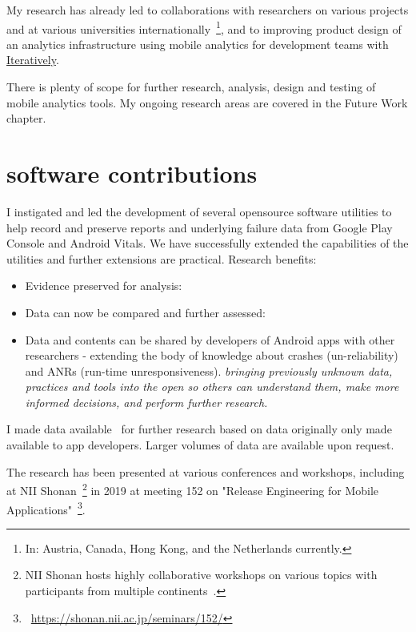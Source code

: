 My research has already led to collaborations with researchers on various projects and at various universities internationally~\footnote{In: Austria, Canada, Hong Kong, and the Netherlands currently.}, and to improving product design of an analytics infrastructure using mobile analytics for development teams with \href{https://iterative.ly/}{Iteratively}. 

There is plenty of scope for further research, analysis, design and testing of mobile analytics tools. My ongoing research areas are covered in the Future Work chapter.

\section{software contributions}
I instigated and led the development of several opensource software utilities to help record and preserve reports and underlying failure data from Google Play Console and Android Vitals. We have successfully extended the capabilities of the utilities and further extensions are practical. Research benefits:
\begin{itemize}
    \item Evidence preserved for analysis:
    \item Data can now be compared and further assessed:
    \item Data and contents can be shared by developers of Android apps with other researchers - extending the body of knowledge about crashes (un-reliability) and ANRs (run-time unresponsiveness). \emph{bringing previously unknown data, practices and tools into the open so others can understand them, make more informed decisions, and perform further research.}
\end{itemize}

I made data available~\cite{harty_wama_dataset_examples} for further research based on data originally only made available to app developers. Larger volumes of data are available upon request.

The research has been presented at various conferences and workshops, including at NII Shonan~\footnote{NII Shonan hosts highly collaborative workshops on various topics with participants from multiple continents~\citep{acm_shonan_workshops_2020}.} in 2019 at meeting 152 on "Release Engineering for Mobile Applications"~\footnote{~\url{https://shonan.nii.ac.jp/seminars/152/}}.

